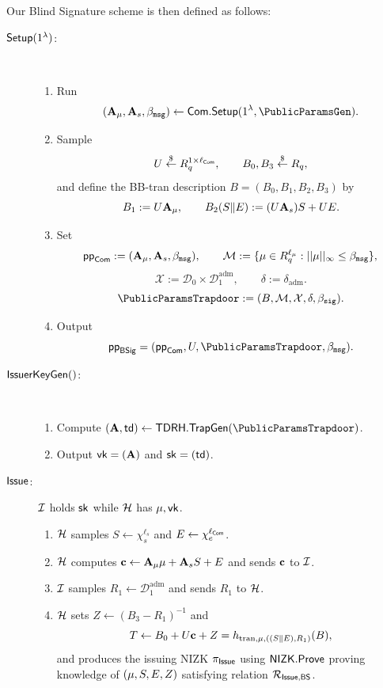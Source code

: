 Our Blind Signature scheme is then defined as follows:
\begin{description}
\item[$\mathsf{Setup}(1^\lambda)$:] ~
\begin{enumerate}
\item Run
\[
(\mA_\mu,\mA_s,\BoundMsg)\gets \ComScheme.\ComSetup(\SecParam,\PublicParamsGen).
\]
\item Sample
\[
U\overset{\$}{\leftarrow} R_q^{1\times \ell_{\mathsf{Com}}},\qquad B_0,B_3\overset{\$}{\leftarrow} R_q,
\]
and define the BB-tran description \(B=(B_0,B_1,B_2,B_3)\) by
\[
B_1:=U\mathbf{A}_\mu,
\qquad
B_2(S\Vert E):=(U\mathbf{A}_s)S + UE.
\]
\item Set
\[
\mathsf{pp}_{\mathsf{Com}}:=(\mathbf{A}_\mu,\mathbf{A}_s,\beta_{\mathtt{msg}}),
\qquad
\mathcal M:=\{\mathbf{\mu}\in R_q^{\ell_\mu}: ||\mathbf{\mu}||_\infty\le \beta_{\mathtt{msg}}\},
\]
\[
\mathcal X:=\mathcal D_0\times \mathcal D_1^{\mathrm{adm}},
\qquad
\delta:=\delta_{\mathrm{adm}}.
\]
\[
\PublicParamsTrapdoor:=(B,\mathcal M,\mathcal X,\delta,\BoundSig).
\]
\item Output
\[
\PublicParamsBS=(\ComPublicParam,U,\PublicParamsTrapdoor,\BoundMsg).
\]
\end{enumerate}
\item[$\mathsf{IssuerKeyGen}()$:] ~
\begin{enumerate}
\item Compute \((\mA,\trapdoor)\gets \TDRH.\TrapGen(\PublicParamsTrapdoor)\).
\item Output \(\mathsf{vk}=(\mathbf{A})\) and \(\mathsf{sk}=(\mathsf{td})\).
\end{enumerate}
\item[$\mathsf{Issue}$:] \(\mathcal{I}\) holds \(\mathsf{sk}\) while \(\mathcal{H}\) has \(\mathbf{\mu},\mathsf{vk}\).
\begin{enumerate}
\item \(\mathcal{H}\) samples \(S\gets \chi_s^{\ell_s}\) and \(E\gets \chi_e^{\ell_{\mathsf{Com}}}\).
\item \(\mathcal{H}\) computes \(\mathbf{c}\gets \mathbf{A}_\mu\mathbf{\mu} + \mathbf{A}_s S + E\) and sends \(\mathbf{c}\) to \(\mathcal{I}\).
\item \(\mathcal{I}\) samples \(R_1\gets \mathcal D_1^{\mathrm{adm}}\) and sends \(R_1\) to \(\mathcal{H}\).
\item \(\mathcal{H}\) sets \(Z\gets (B_3-R_1)^{-1}\) and
\begin{equation}\label{bs:step:issuancenizk}
T\gets B_0 + U\mathbf{c} + Z = h_{\mathrm{tran},\mathbf{\mu},((S\Vert E),R_1)}(B),
\end{equation}
and produces the issuing NIZK \(\pi_{\mathsf{Issue}}\) using \(\mathsf{NIZK}.\mathsf{Prove}\) proving knowledge of
\((\mathbf{\mu},S,E,Z)\) satisfying relation \(\mathcal{R}_{\mathsf{Issue,BS}}\).

\end{enumerate}
\end{description}
